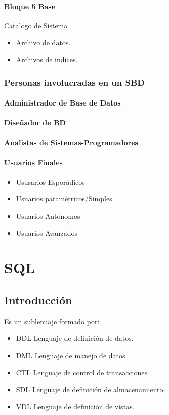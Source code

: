 \documentclass[12pt, fleqn]{report}                             %
\theoremstyle{break}                                            %
\begin{document}
		\subsubsection{Bloque 5 Base}

		Catalogo de Sistema
		\begin{itemize}
			\item Archivo de datos.
			\item Archivos de indices.
		\end{itemize}



	\subsection{Personas involucradas en un SBD}

		\subsubsection{Administrador de Base de Datos}
		\subsubsection{Diseñador de BD}
		\subsubsection{Analistas de Sistemas-Programadores}
		\subsubsection{Usuarios Finales}
		\begin{itemize}
			\item Ususarios Esporádicos
			\item Usuarios paramétricos/Simples
			\item Usuarios Autónomos
			\item Usuarios Avanzados
		\end{itemize}
\chapter{SQL}
	\section{Introducción}
	Es un sublenuaje formado por:
	\begin{itemize}
		\item DDL Lenguaje de definición de datos.
		\item DML Lenguaje de manejo de datos
		\item CTL Lenguaje de control de transacciones.
		\item SDL Lenguaje de definición de almacenamiento.
		\item VDL Lenguaje de definición de vistas.
	\end{itemize}
\end{document}
